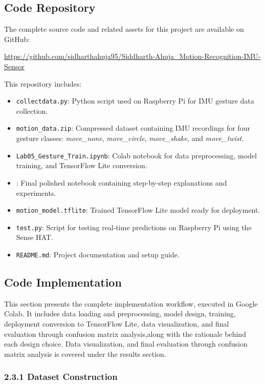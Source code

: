 \documentclass[a4paper,12pt]{article}
\begin{document}
\subsection{Code Repository}

The complete source code and related assets for this project are available on GitHub:

\url{https://github.com/sidharthahuja95/Siddharth-Ahuja_Motion-Recognition-IMU-Sensor}

This repository includes:

\begin{itemize}
    \item \texttt{collectdata.py}: Python script used on Raspberry Pi for IMU gesture data collection.
    \item \texttt{motion\_data.zip}: Compressed dataset containing IMU recordings for four gesture classes: \textit{move\_none}, \textit{move\_circle}, \textit{move\_shake}, and \textit{move\_twist}.
    \item \texttt{Lab05\_Gesture\_Train.ipynb}: Colab notebook for data preprocessing, model training, and TensorFlow Lite conversion.
    \item \texttt{}: Final polished notebook containing step-by-step explanations and experiments.
    \item \texttt{motion\_model.tflite}: Trained TensorFlow Lite model ready for deployment.
    \item \texttt{test.py}: Script for testing real-time predictions on Raspberry Pi using the Sense HAT.
    \item \texttt{README.md}: Project documentation and setup guide.
\end{itemize}



\subsection{Code Implementation}
This section presents the complete implementation workflow, executed in Google Colab. It includes data loading and preprocessing, model design, training, deployment conversion to TensorFlow Lite, data visualization, and final evaluation through confusion matrix analysis,along with the rationale behind each design choice. Data visualization, and final evaluation through confusion matrix analysis is covered under the results section.
\subsubsection*{2.3.1 Dataset Construction}
\end{document}
